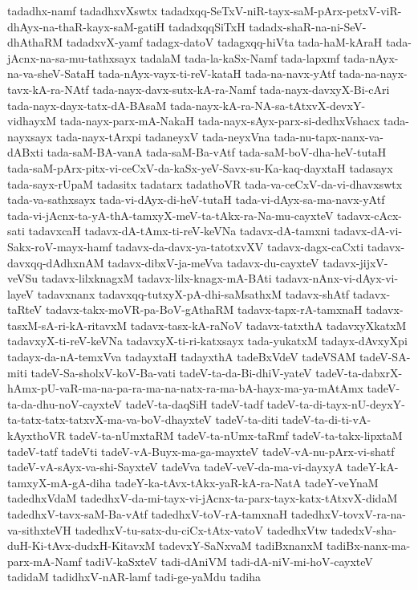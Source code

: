 {tadadhx-namf
tadadhxvXswtx
tadadxqq-SeTxV-niR-tayx-saM-pArx-petxV-viR-dhAyx-na-thaR-kayx-saM-gatiH
tadadxqqSiTxH
tadadx-shaR-na-ni-SeV-dhAthaRM
tadadxvX-yamf
tadagx-datoV
tadagxqq-hiVta
tada-haM-kAraH
tada-jAcnx-na-sa-mu-tathxsayx
tadalaM
tada-la-kaSx-Namf
tada-lapxmf
tada-nAyx-na-va-sheV-SataH
tada-nAyx-vayx-ti-reV-kataH
tada-na-navx-yAtf
tada-na-nayx-tavx-kA-ra-NAtf
tada-nayx-davx-sutx-kA-ra-Namf
tada-nayx-davxyX-Bi-cAri
tada-nayx-dayx-tatx-dA-BAsaM
tada-nayx-kA-ra-NA-sa-tAtxvX-devxY-vidhayxM
tada-nayx-parx-mA-NakaH
tada-nayx-sAyx-parx-si-dedhxVshacx
tada-nayxsayx
tada-nayx-tArxpi
tadaneyxV
tada-neyxVna
tada-nu-tapx-nanx-va-dABxti
tada-saM-BA-vanA
tada-saM-Ba-vAtf
tada-saM-boV-dha-heV-tutaH
tada-saM-pArx-pitx-vi-ceCxV-da-kaSx-yeV-Savx-su-Ka-kaq-dayxtaH
tadasayx
tada-sayx-rUpaM
tadasitx
tadatarx
tadathoVR
tada-va-ceCxV-da-vi-dhavxswtx
tada-va-sathxsayx
tada-vi-dAyx-di-heV-tutaH
tada-vi-dAyx-sa-ma-navx-yAtf
tada-vi-jAcnx-ta-yA-thA-tamxyX-meV-ta-tAkx-ra-Na-mu-cayxteV
tadavx-cAcx-sati
tadavxcaH
tadavx-dA-tAmx-ti-reV-keVNa
tadavx-dA-tamxni
tadavx-dA-vi-Sakx-roV-mayx-hamf
tadavx-da-davx-ya-tatotxvXV
tadavx-dagx-caCxti
tadavx-davxqq-dAdhxnAM
tadavx-dibxV-ja-meVva
tadavx-du-cayxteV
tadavx-jijxV-veVSu
tadavx-lilxknagxM
tadavx-lilx-knagx-mA-BAti
tadavx-nAnx-vi-dAyx-vi-layeV
tadavxnanx
tadavxqq-tutxyX-pA-dhi-saMsathxM
tadavx-shAtf
tadavx-taRteV
tadavx-takx-moVR-pa-BoV-gAthaRM
tadavx-tapx-rA-tamxnaH
tadavx-tasxM-sA-ri-kA-ritavxM
tadavx-tasx-kA-raNoV
tadavx-tatxthA
tadavxyXkatxM
tadavxyX-ti-reV-keVNa
tadavxyX-ti-ri-katxsayx
tada-yukatxM
tadayx-dAvxyXpi
tadayx-da-nA-temxVva
tadayxtaH
tadayxthA
tadeBxVdeV
tadeVSAM
tadeV-SA-miti
tadeV-Sa-sholxV-koV-Ba-vati
tadeV-ta-da-Bi-dhiV-yateV
tadeV-ta-dabxrX-hAmx-pU-vaR-ma-na-pa-ra-ma-na-natx-ra-ma-bA-hayx-ma-ya-mAtAmx
tadeV-ta-da-dhu-noV-cayxteV
tadeV-ta-daqSiH
tadeV-tadf
tadeV-ta-di-tayx-nU-deyxY-ta-tatx-tatx-tatxvX-ma-va-boV-dhayxteV
tadeV-ta-diti
tadeV-ta-di-ti-vA-kAyxthoVR
tadeV-ta-nUmxtaRM
tadeV-ta-nUmx-taRmf
tadeV-ta-takx-lipxtaM
tadeV-tatf
tadeVti
tadeV-vA-Buyx-ma-ga-mayxteV
tadeV-vA-nu-pArx-vi-shatf
tadeV-vA-sAyx-va-shi-SayxteV
tadeVva
tadeV-veV-da-ma-vi-dayxyA
tadeY-kA-tamxyX-mA-gA-diha
tadeY-ka-tAvx-tAkx-yaR-kA-ra-NatA
tadeY-veYnaM
tadedhxVdaM
tadedhxV-da-mi-tayx-vi-jAcnx-ta-parx-tayx-katx-tAtxvX-didaM
tadedhxV-tavx-saM-Ba-vAtf
tadedhxV-toV-rA-tamxnaH
tadedhxV-tovxV-ra-na-va-sithxteVH
tadedhxV-tu-satx-du-ciCx-tAtx-vatoV
tadedhxVtw
tadedxV-sha-duH-Ki-tAvx-dudxH-KitavxM
tadevxY-SaNxvaM
tadiBxnanxM
tadiBx-nanx-ma-parx-mA-Namf
tadiV-kaSxteV
tadi-dAniVM
tadi-dA-niV-mi-hoV-cayxteV
tadidaM
tadidhxV-nAR-lamf
tadi-ge-yaMdu
tadiha
}
